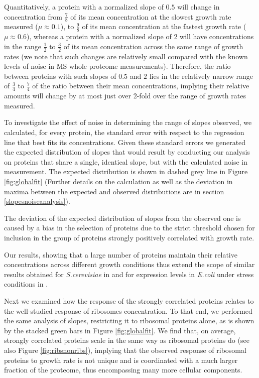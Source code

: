 Quantitatively, a protein with a normalized slope of $0.5$ will change in concentration from $\frac{7}{8}$ of its mean concentration at the slowest growth rate measured ($\mu \approx 0.1$), to $\frac{9}{8}$ of its mean concentration at the fastest growth rate ($\mu \approx 0.6$), whereas a protein with a normalized slope of $2$ will have concentrations in the range $\frac{1}{2}$ to $\frac{3}{2}$ of its mean concentration across the same range of growth rates (we note that such changes are relatively small compared with the known levels of noise in MS whole proteome measurements).
Therefore, the ratio between proteins with such slopes of $0.5$ and $2$ lies in the relatively narrow range of $\frac{3}{4}$ to $\frac{7}{4}$ of the ratio between their mean concentrations, implying their relative amounts will change by at most just over 2-fold over the range of growth rates measured.

To investigate the effect of noise in determining the range of slopes observed, we calculated, for every protein, the standard error with respect to the regression line that best fits its concentrations.
Given these standard errors we generated the expected distribution of slopes that would result by conducting our analysis on proteins that share a single, identical slope, but with the calculated noise in measurement.
The expected distribution is shown in dashed grey line in Figure \ref{fig:globalfit} (Further details on the calculation as well as the deviation in maxima between the expected and observed distributions are in section \ref{slopesnoiseanalysis}).

The deviation of the expected distribution of slopes from the observed one is caused by a bias in the selection of proteins due to the strict threshold chosen for inclusion in the group of proteins strongly positively correlated with growth rate.

Our results, showing that a large number of proteins maintain their relative concentrations across different growth conditions thus extend the scope of similar results obtained for \emph{S.cerevisiae} in \cite{Keren2013a} and for expression levels in \emph{E.coli} under stress conditions in \cite{Kaneko2014}.

Next we examined how the response of the strongly correlated proteins relates to the well-studied response of ribosomes concentration.
To that end, we performed the same analysis of slopes, restricting it to ribosomal proteins alone, as is shown by the stacked green bars in Figure \ref{fig:globalfit}.
We find that, on average, strongly correlated proteins scale in the same way as ribosomal proteins do (see also Figure \ref{fig:ribsnonribs}), implying that the observed response of ribosomal proteins to growth rate is not unique and is coordinated with a much larger fraction of the proteome, thus encompassing many more cellular components.
\begin{comment}
\emph{ToDo: literature survey on mechanisms suggested to control ribosomes concentration to check whether they are for RNA to protein coordination, rRNA to mRNA control, or ribosomal protein control, with our findings highlighting questions on the last ones}.
\end{comment}